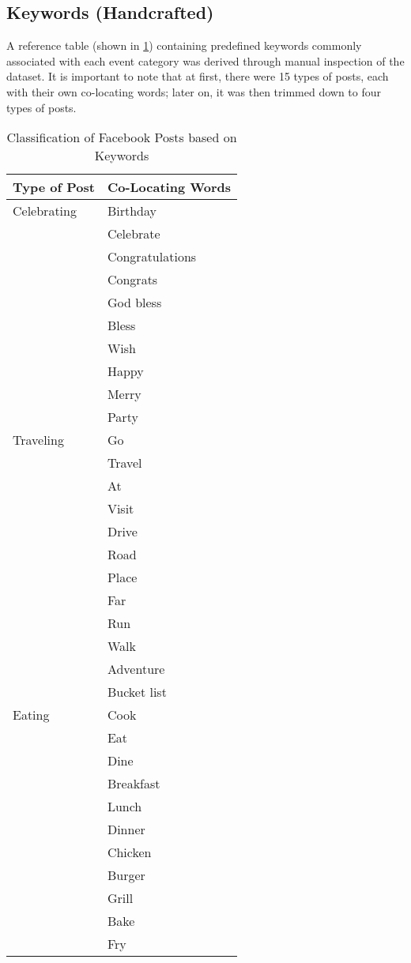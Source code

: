 \subsection{Keywords (Handcrafted)}
A reference table (shown in \ref{tab:EventClassification}) containing predefined keywords commonly associated with each event category was derived through manual inspection of the dataset. It is important to note that at first, there were 15 types of posts, each with their own co-locating words; later on, it was then trimmed down to four types of posts.
\clearpage
\begin{table}[ph!]   %
	\centering
	\caption{Classification of Facebook Posts based on Keywords} \vspace{0.25em}
	\begin{tabular}{|p{1.5in}|p{2in}|} \hline
		\centering Type of Post & Co-Locating Words \\ \hline
		Celebrating & 
			 Birthday \\
			 &  Celebrate \\
		 	&Congratulations \\
			 & Congrats \\
			 & God bless \\		
			 & Bless \\
			 & Wish \\
			 & Happy \\
			 & Merry \\
			 & Party \\
		 \hline
		Traveling & 
			 Go \\ 
			 &  Travel \\ 
			 &  At \\
			 &  Visit \\
			 &  Drive \\
			 &  Road \\
			 &  Place \\
			 &  Far \\
			 &  Run \\
			 &  Walk \\
			 &  Adventure \\
			  & Bucket list \\
		 \hline
		Eating & 
			 Cook \\
			 &  Eat \\
			 &  Dine \\
			 &  Breakfast \\
			 &  Lunch \\ 
			 &  Dinner \\
			 &  Chicken \\
			 &  Burger \\
			 &  Grill \\
			 &  Bake \\ 
			 &  Fry \\
		 \hline
	\end{tabular}
	\label{tab:EventClassification}
\end{table}

